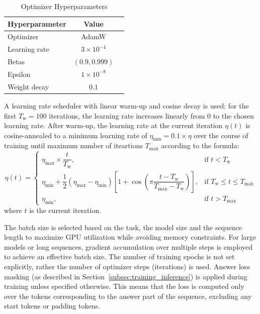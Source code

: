 \begin{table}[h]
    \centering
    \caption{Optimizer Hyperparameters}
    \label{tab:optimizer_hyperparameters}
    \begin{tabular}{lcc}
        \toprule
        Hyperparameter & Value              \\
        \midrule
        Optimizer      & AdamW              \\
        Learning rate  & $3 \times 10^{-4}$ \\
        Betas          & $(0.9, 0.999)$     \\
        Epsilon        & $1 \times 10^{-8}$ \\
        Weight decay   & $0.1$              \\
        \bottomrule
    \end{tabular}
\end{table}

A learning rate scheduler with linear warm-up and cosine decay is used; for the first $T_{\text{w}} = 100$ iterations, the learning rate increases linearly from $0$ to the chosen learning rate. After warm-up, the learning rate at the current iteration $\eta(t)$ is cosine-annealed to a minimum learning rate of $\eta_{\text{min}} = 0.1 \times \eta$ over the course of training until maximum number of iteartions $T_{\text{max}}$ according to the formula:
\[
    \eta(t) =
    \begin{cases}
        \eta_{\text{max}} \times \dfrac{t}{T_{\text{w}}},                                                                                                                          & \text{if } t < T_{\text{w}}                        \\
        \eta_{\text{min}} + \dfrac{1}{2} (\eta_{\text{max}} - \eta_{\text{min}}) \left[1 + \cos\left( \pi \dfrac{t - T_{\text{w}}}{T_{\text{max}} - T_{\text{w}}} \right) \right], & \text{if } T_{\text{w}} \leq t \leq T_{\text{max}} \\
        \eta_{\text{min}},                                                                                                                                                         & \text{if } t > T_{\text{max}}
    \end{cases}
\]
where $t$ is the current iteration.

The batch size is selected based on the task, the model size and the sequence length to maximize GPU utilization while avoiding memory constraints. For large models or long sequences, gradient accumulation over multiple steps is employed to achieve an effective batch size. The number of training epochs is not set explicitly, rather the number of optimizer steps (iterations) is used. Answer loss masking (as described in Section~\ref{subsec:training_inference}) is applied during training unless specified otherwise. This means that the loss is computed only over the tokens corresponding to the answer part of the sequence, excluding any start tokens or padding tokens.

